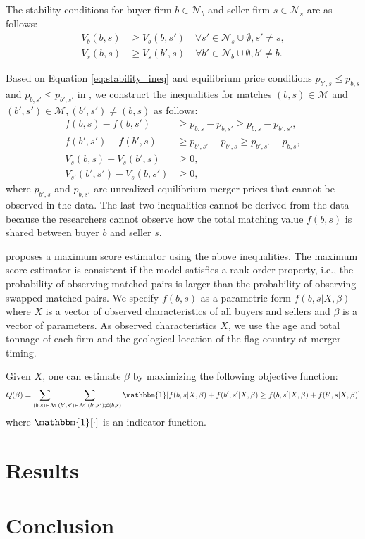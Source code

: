 \documentclass[10pt]{article}
\begin{document}
The stability conditions for buyer firm $b \in \mathcal{N}_b$ and seller firm $s \in \mathcal{N}_s$ are as follows:
\begin{align}
    V_b(b,s) &\ge V_b(b,s') \quad \forall s' \in \mathcal{N}_s \cup \emptyset,s'\neq s,\label{eq:stability_ineq}\\
    V_s(b,s) &\ge V_s(b',s) \quad \forall b' \in \mathcal{N}_b\cup \emptyset,b'\neq b.\nonumber
\end{align}

Based on Equation \eqref{eq:stability_ineq} and equilibrium price conditions $p_{b',s}\le p_{b,s}$ and $p_{b,s'}\le p_{b',s'}$ in \cite{akkus2015ms}, we construct the inequalities for matches $(b,s)\in \mathcal{M}$ and $(b',s')\in \mathcal{M}, (b',s')\neq(b,s)$ as follows:
\begin{align}
    f(b,s)-f(b,s')&\ge p_{b,s}-p_{b,s'}\ge p_{b,s}-p_{b',s'},\label{eq:pairwise_stable_ineq}\\
    f(b',s')-f(b',s)&\ge p_{b',s'}-p_{b',s}\ge p_{b',s'}-p_{b,s},\nonumber\\
    V_s(b,s)-V_s(b',s)&\ge 0,\nonumber\\
    V_{s'}(b',s')-V_s(b,s')&\ge 0,\nonumber
\end{align}
where $p_{b',s}$ and $p_{b,s'}$ are unrealized equilibrium merger prices that cannot be observed in the data. The last two inequalities cannot be derived from the data because the researchers cannot observe how the total matching value $f(b,s)$ is shared between buyer $b$ and seller $s$.

\cite{fox2018estimating} proposes a maximum score
estimator using the above inequalities. The maximum score estimator is consistent if the model satisfies a rank order property, i.e., the probability of observing matched pairs is larger than the probability of observing swapped matched pairs. We specify $f(b,s)$ as a parametric form $f(b,s|X,\beta)$ where $X$ is a vector of observed characteristics of all buyers and sellers and $\beta$ is a vector of parameters. As observed characteristics $X$, we use the age and total tonnage of each firm and the geological location of the flag country at merger timing.


Given $X$, one can estimate $\beta$ by maximizing the following objective function:
\begin{align}
    Q(\beta)=\sum_{(b,s)\in \mathcal{M}} \sum_{(b',s')\in \mathcal{M},(b',s')\neq (b,s)} \mathbbm{1}[f(b,s|X,\beta)+ f(b',s'|X,\beta)\ge f(b,s'|X,\beta)+f(b',s|X,\beta)]\label{eq:score_function}
\end{align}
where $\mathbbm{1}[\cdot]$ is an indicator function.


\section{Results}

\section{Conclusion}



\end{document}
